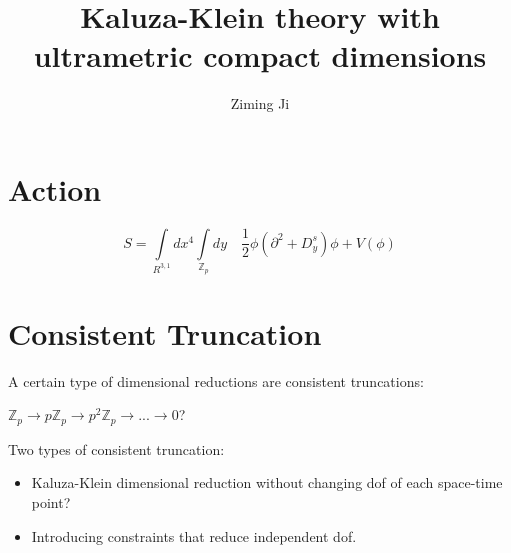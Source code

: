 \documentclass[12pt]{article}
\begin{document}
 
\title{Kaluza-Klein theory with ultrametric compact dimensions}
\author{Ziming Ji}
 
\maketitle
 
\section{Action}
\begin{equation} \label{action1}
S=\int\limits_{R^{3,1}}dx^4\int\limits_{\mathbb{Z}_p}dy\quad\frac{1}{2}\phi(\partial^2+D_y^s)\phi+V(\phi)
\end{equation}

\section{Consistent Truncation}
A certain type of dimensional reductions are consistent truncations:

$\mathbb{Z}_p\rightarrow p\mathbb{Z}_p\rightarrow p^2\mathbb{Z}_p\rightarrow ... \rightarrow 0$?

Two types of consistent truncation:
\begin{itemize}
\item Kaluza-Klein dimensional reduction without changing dof of each space-time point?
\item Introducing constraints that reduce independent dof.
\end{itemize}
\end{document}
